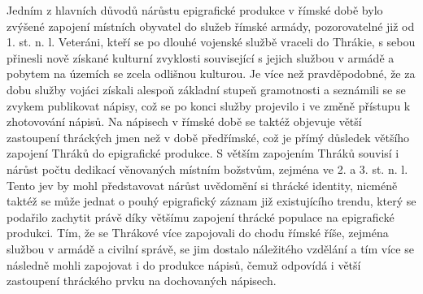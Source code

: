 Jedním z hlavních důvodů nárůstu epigrafické produkce v římské době bylo zvýšené zapojení místních obyvatel do služeb římské armády, pozorovatelné již od 1. st. n. l. Veteráni, kteří se po dlouhé vojenské službě vraceli do Thrákie, s sebou přinesli nově získané kulturní zvyklosti související s jejich službou v armádě a pobytem na územích se zcela odlišnou kulturou. Je více než pravděpodobné, že za dobu služby vojáci získali alespoň základní stupeň gramotnosti a seznámili se se zvykem publikovat nápisy, což se po konci služby projevilo i ve změně přístupu k zhotovování nápisů. Na nápisech v římské době se taktéž objevuje větší zastoupení thráckých jmen než v době předřímské, což je přímý důsledek většího zapojení Thráků do epigrafické produkce. S větším zapojením Thráků souvisí i nárůst počtu dedikací věnovaných místním božstvům, zejména ve 2. a 3. st. n. l. Tento jev by mohl představovat nárůst uvědomění si thrácké identity, nicméně taktéž se může jednat o pouhý epigrafický záznam již existujícího trendu, který se podařilo zachytit právě díky většímu zapojení thrácké populace na epigrafické produkci. Tím, že se Thrákové více zapojovali do chodu římské říše, zejména službou v armádě a civilní správě, se jim dostalo náležitého vzdělání a tím více se následně mohli zapojovat i do produkce nápisů, čemuž odpovídá i větší zastoupení thráckého prvku na dochovaných nápisech.

